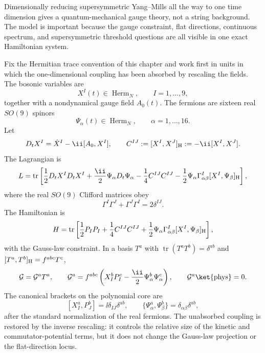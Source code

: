 Dimensionally reducing supersymmetric Yang--Mills all the way to one time
dimension gives a quantum-mechanical gauge theory, not a string background.
The model is important because the gauge constraint, flat directions,
continuous spectrum, and supersymmetric threshold questions are all visible in
one exact Hamiltonian system.

\begin{definition}
\label{def:maximal-un-matrix-gauge-qm}
Fix the Hermitian trace convention of this chapter and work first in units in
which the one-dimensional coupling has been absorbed by rescaling the fields.
The bosonic variables are
\[
  X^I(t)\in\operatorname{Herm}_N,\qquad I=1,\ldots,9,
\]
together with a nondynamical gauge field \(A_0(t)\).  The fermions are
sixteen real \(SO(9)\) spinors
\[
  \Psi_\alpha(t)\in\operatorname{Herm}_N,\qquad \alpha=1,\ldots,16.
\]
Let
\[
  D_tX^I=\dot X^I-\ii[A_0,X^I],
  \qquad
  C^{IJ}:=[X^I,X^J]_{\rm H}:=-\ii[X^I,X^J].
\]
The Lagrangian is
\begin{equation}
  L
  =
  \operatorname{tr}\left[
    \frac12D_tX^I D_tX^I
    +\frac{\ii}{2}\Psi_\alpha D_t\Psi_\alpha
    -\frac14 C^{IJ}C^{IJ}
    -\frac12\Psi_\alpha\Gamma^I_{\alpha\beta}[X^I,\Psi_\beta]_{\rm H}
  \right],
  \label{eq:maximal-matrix-qm-lagrangian}
\end{equation}
where the real \(SO(9)\) Clifford matrices obey
\[
  \Gamma^I\Gamma^J+\Gamma^J\Gamma^I=2\delta^{IJ}.
\]
The Hamiltonian is
\begin{equation}
  H
  =
  \operatorname{tr}\left[
    \frac12P_I P_I
    +\frac14 C^{IJ}C^{IJ}
    +\frac12\Psi_\alpha\Gamma^I_{\alpha\beta}
      [X^I,\Psi_\beta]_{\rm H}
  \right],
  \label{eq:maximal-matrix-qm-hamiltonian}
\end{equation}
with the Gauss-law constraint.  In a basis \(T^a\) with
\(\operatorname{tr}(T^aT^b)=\delta^{ab}\) and
\([T^a,T^b]_{\rm H}=f^{abc}T^c\),
\begin{equation}
  \mathcal G=\mathcal G^aT^a,
  \qquad
  \mathcal G^a
  =
  f^{abc}
  \left(
    X_I^bP_I^c-\frac{\ii}{2}\Psi_\alpha^b\Psi_\alpha^c
  \right),
  \qquad
  \mathcal G^a\ket{\mathrm{phys}}=0 .
  \label{eq:maximal-matrix-qm-gauss-law}
\end{equation}
The canonical brackets on the polynomial core are
\[
  [X_I^a,P_J^b]=\ii\delta_{IJ}\delta^{ab},
  \qquad
  \{\Psi_\alpha^a,\Psi_\beta^b\}=\delta_{\alpha\beta}\delta^{ab},
\]
after the standard normalization of the real fermions.
The unabsorbed coupling is restored by the inverse rescaling: it controls the
relative size of the kinetic and commutator-potential terms, but it does not
change the Gauss-law projection or the flat-direction locus.
\end{definition}

